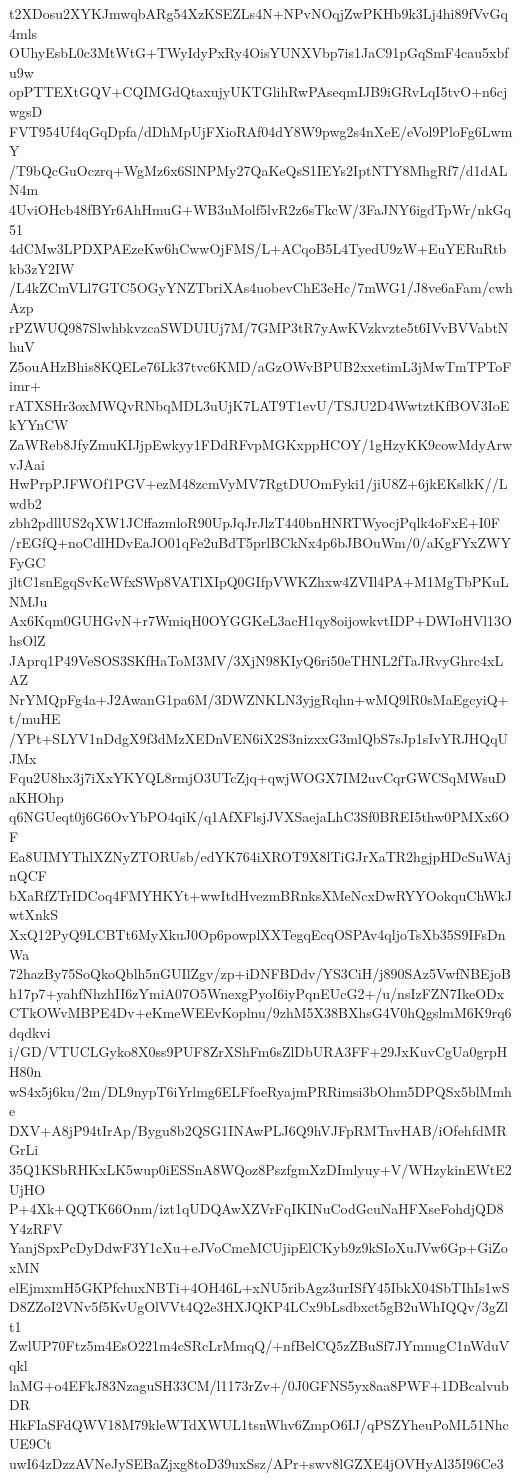 t2XDosu2XYKJmwqbARg54XzKSEZLs4N+NPvNOqjZwPKHb9k3Lj4hi89fVvGq4mls
OUhyEsbL0c3MtWtG+TWyIdyPxRy4OisYUNXVbp7is1JaC91pGqSmF4cau5xbfu9w
opPTTEXtGQV+CQIMGdQtaxujyUKTGlihRwPAseqmIJB9iGRvLqI5tvO+n6cjwgsD
FVT954Uf4qGqDpfa/dDhMpUjFXioRAf04dY8W9pwg2s4nXeE/eVol9PloFg6LwmY
/T9bQcGuOczrq+WgMz6x6SlNPMy27QaKeQsS1IEYs2IptNTY8MhgRf7/d1dALN4m
4UviOHcb48fBYr6AhHmuG+WB3uMolf5lvR2z6sTkcW/3FaJNY6igdTpWr/nkGq51
4dCMw3LPDXPAEzeKw6hCwwOjFMS/L+ACqoB5L4TyedU9zW+EuYERuRtbkb3zY2IW
/L4kZCmVLl7GTC5OGyYNZTbriXAs4uobevChE3eHc/7mWG1/J8ve6aFam/cwhAzp
rPZWUQ987SlwhbkvzcaSWDUIUj7M/7GMP3tR7yAwKVzkvzte5t6IVvBVVabtNhuV
Z5ouAHzBhis8KQELe76Lk37tvc6KMD/aGzOWvBPUB2xxetimL3jMwTmTPToFimr+
rATXSHr3oxMWQvRNbqMDL3uUjK7LAT9T1evU/TSJU2D4WwtztKfBOV3IoEkYYnCW
ZaWReb8JfyZmuKIJjpEwkyy1FDdRFvpMGKxppHCOY/1gHzyKK9cowMdyArwvJAai
HwPrpPJFWOf1PGV+ezM48zcmVyMV7RgtDUOmFyki1/jiU8Z+6jkEKslkK//Lwdb2
zbh2pdllUS2qXW1JCffazmloR90UpJqJrJlzT440bnHNRTWyocjPqlk4oFxE+I0F
/rEGfQ+noCdlHDvEaJO01qFe2uBdT5prlBCkNx4p6bJBOuWm/0/aKgFYxZWYFyGC
jltC1snEgqSvKcWfxSWp8VATlXIpQ0GIfpVWKZhxw4ZVIl4PA+M1MgTbPKuLNMJu
Ax6Kqm0GUHGvN+r7WmiqH0OYGGKeL3acH1qy8oijowkvtIDP+DWIoHVl13OhsOlZ
JAprq1P49VeSOS3SKfHaToM3MV/3XjN98KIyQ6ri50eTHNL2fTaJRvyGhrc4xLAZ
NrYMQpFg4a+J2AwanG1pa6M/3DWZNKLN3yjgRqhn+wMQ9lR0sMaEgcyiQ+t/muHE
/YPt+SLYV1nDdgX9f3dMzXEDnVEN6iX2S3nizxxG3mlQbS7sJp1sIvYRJHQqUJMx
Fqu2U8hx3j7iXxYKYQL8rmjO3UTcZjq+qwjWOGX7IM2uvCqrGWCSqMWsuDaKHOhp
q6NGUeqt0j6G6OvYbPO4qiK/q1AfXFlsjJVXSaejaLhC3Sf0BREI5thw0PMXx6OF
Ea8UIMYThlXZNyZTORUsb/edYK764iXROT9X8lTiGJrXaTR2hgjpHDcSuWAjnQCF
bXaRfZTrIDCoq4FMYHKYt+wwItdHvezmBRnksXMeNcxDwRYYOokquChWkJwtXnkS
XxQ12PyQ9LCBTt6MyXkuJ0Op6powplXXTegqEcqOSPAv4qljoTsXb35S9IFsDnWa
72hazBy75SoQkoQblh5nGUIlZgv/zp+iDNFBDdv/YS3CiH/j890SAz5VwfNBEjoB
h17p7+yahfNhzhII6zYmiA07O5WnexgPyoI6iyPqnEUcG2+/u/nsIzFZN7IkeODx
CTkOWvMBPE4Dv+eKmeWEEvKoplnu/9zhM5X38BXhsG4V0hQgslmM6K9rq6dqdkvi
i/GD/VTUCLGyko8X0ss9PUF8ZrXShFm6sZlDbURA3FF+29JxKuvCgUa0grpHH80n
wS4x5j6ku/2m/DL9nypT6iYrlmg6ELFfoeRyajmPRRimsi3bOhm5DPQSx5blMmhe
DXV+A8jP94tIrAp/Bygu8b2QSG1INAwPLJ6Q9hVJFpRMTnvHAB/iOfehfdMRGrLi
35Q1KSbRHKxLK5wup0iESSnA8WQoz8PszfgmXzDImlyuy+V/WHzykinEWtE2UjHO
P+4Xk+QQTK66Onm/izt1qUDQAwXZVrFqIKINuCodGcuNaHFXseFohdjQD8Y4zRFV
YanjSpxPcDyDdwF3Y1cXu+eJVoCmeMCUjipElCKyb9z9kSIoXuJVw6Gp+GiZoxMN
elEjmxmH5GKPfchuxNBTi+4OH46L+xNU5ribAgz3urISfY45IbkX04SbTIhIs1wS
D8ZZoI2VNv5f5KvUgOlVVt4Q2e3HXJQKP4LCx9bLsdbxct5gB2uWhIQQv/3gZlt1
ZwlUP70Ftz5m4EsO221m4cSRcLrMmqQ/+nfBelCQ5zZBuSf7JYmnugC1nWduVqkl
laMG+o4EFkJ83NzaguSH33CM/l1173rZv+/0J0GFNS5yx8aa8PWF+1DBcalvubDR
HkFIaSFdQWV18M79kleWTdXWUL1tsnWhv6ZmpO6IJ/qPSZYheuPoML51NhcUE9Ct
uwI64zDzzAVNeJySEBaZjxg8toD39uxSsz/APr+swv8lGZXE4jOVHyAl35I96Ce3
